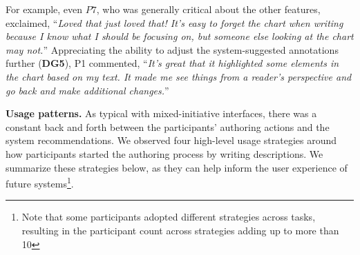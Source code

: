 For example, even $P7$, who was generally critical about the other features, exclaimed, ``\textit{Loved that just loved that! It's easy to forget the chart when writing because I know what I should be focusing on, but someone else looking at the chart may not.}''
Appreciating the ability to adjust the system-suggested annotations further (\textbf{DG5}), P1 commented, ``\textit{It's great that it highlighted some elements in the chart based on my text. It made me see things from a reader's perspective and go back and make additional changes.}''

\vspace{.5em}
\noindent\textbf{Usage patterns.}
As typical with mixed-initiative interfaces, there was a constant back and forth between the participants' authoring actions and the system recommendations. We observed four high-level usage strategies around how participants started the authoring process by writing descriptions. We summarize these strategies below, as they can help inform the user experience of future systems\footnote{Note that some participants adopted different strategies across tasks, resulting in the participant count across strategies adding up to more than 10}.

